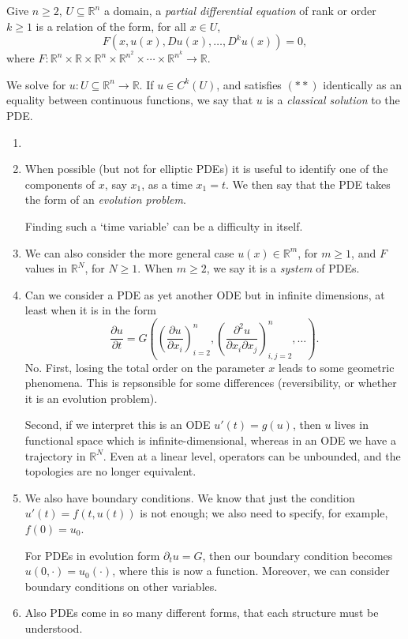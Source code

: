 \documentclass[12pt]{article}
\begin{document}
\begin{definition}
	Give $n \geq 2$, $U \subseteq \mathbb{R}^n$ a domain, a \emph{partial differential equation} of rank or order $k \geq 1$ is a relation of the form, for all $x \in U$,
	\[
		F(x, u(x), Du(x), \ldots, D^k u(x)) = 0 \tag{$\ast\ast$},
	\]
	where $F : \mathbb{R}^n \times \mathbb{R} \times \mathbb{R}^n \times \mathbb{R}^{n^2} \times \cdots \times \mathbb{R}^{n^k} \to \mathbb{R}$.

	We solve for $u : U \subseteq \mathbb{R}^n \to \mathbb{R}$. If $u \in C^k(U)$, and satisfies $(\ast\ast)$ identically as an equality between continuous functions, we say that $u$ is a \emph{classical solution} to the PDE.
\end{definition}

\begin{remark}
	\begin{enumerate}[1.]
		\item[]
		\item When possible (but not for elliptic PDEs) it is useful to identify one of the components of $x$, say $x_1$, as a time $x_1 = t$. We then say that the PDE takes the form of an \emph{evolution problem}.

			Finding such a `time variable' can be a difficulty in itself.
		\item We can also consider the more general case $u(x) \in \mathbb{R}^m$, for $m \geq 1$, and $F$ values in $\mathbb{R}^N$, for $N \geq 1$. When $m \geq 2$, we say it is a \emph{system} of PDEs.
		\item Can we consider a PDE as yet another ODE but in infinite dimensions, at least when it is in the form
			\[
			\frac{\partial u}{\partial t} = G \left( \left( \frac{\partial u}{\partial x_i} \right)_{i = 2}^n, \left( \frac{\partial^2 u}{\partial x_i \partial x_j} \right)_{i, j = 2} ^n , \ldots \right).
			\]
			No. First, losing the total order on the parameter $x$ leads to some geometric phenomena. This is repsonsible for some differences (reversibility, or whether it is an evolution problem).

Second, if we interpret this is an ODE $u'(t) = g(u)$, then $u$ lives in functional space which is infinite-dimensional, whereas in an ODE we have a trajectory in $\mathbb{R}^N$. Even at a linear level, operators can be unbounded, and the topologies are no longer equivalent.
\item We also have boundary conditions. We know that just the condition $u'(t) = f(t, u(t))$ is not enough; we also need to specify, for example, $f(0) = u_0$.

	For PDEs in evolution form $\partial_t u = G$, then our boundary condition becomes $u(0, \cdot) = u_0(\cdot)$, where this is now a function. Moreover, we can consider boundary conditions on other variables.
\item Also PDEs come in so many different forms, that each structure must be understood.
	\end{enumerate}
	
\end{remark}
\end{document}
